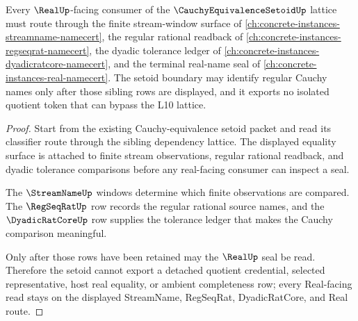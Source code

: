\begin{theorem}
\label{thm:cauchy-equivalence-setoid-real-seal-nonescape}
Every $\RealUp$-facing consumer of the $\CauchyEquivalenceSetoidUp$ lattice must route through the finite stream-window surface of \autoref{ch:concrete-instances-streamname-namecert}, the regular rational readback of \autoref{ch:concrete-instances-regseqrat-namecert}, the dyadic tolerance ledger of \autoref{ch:concrete-instances-dyadicratcore-namecert}, and the terminal real-name seal of \autoref{ch:concrete-instances-real-namecert}. The setoid boundary may identify regular Cauchy names only after those sibling rows are displayed, and it exports no isolated quotient token that can bypass the L10 lattice.
\end{theorem}
\begin{proof}
Start from the existing Cauchy-equivalence setoid packet and read its classifier route through the sibling dependency lattice. The displayed equality surface is attached to finite stream observations, regular rational readback, and dyadic tolerance comparisons before any real-facing consumer can inspect a seal.

The $\StreamNameUp$ windows determine which finite observations are compared. The $\RegSeqRatUp$ row records the regular rational source names, and the $\DyadicRatCoreUp$ row supplies the tolerance ledger that makes the Cauchy comparison meaningful.

Only after those rows have been retained may the $\RealUp$ seal be read. Therefore the setoid cannot export a detached quotient credential, selected representative, host real equality, or ambient completeness row; every Real-facing read stays on the displayed StreamName, RegSeqRat, DyadicRatCore, and Real route.
\end{proof}
